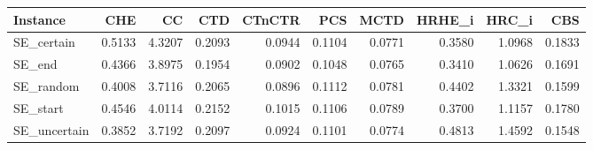 \begin{tabular}{lrrrrrrrrr}
\toprule
Instance & CHE & CC & CTD & CTnCTR & PCS & MCTD & HRHE_i & HRC_i & CBS \\
\midrule
SE_certain & 0.5133 & 4.3207 & 0.2093 & 0.0944 & 0.1104 & 0.0771 & 0.3580 & 1.0968 & 0.1833 \\
SE_end & 0.4366 & 3.8975 & 0.1954 & 0.0902 & 0.1048 & 0.0765 & 0.3410 & 1.0626 & 0.1691 \\
SE_random & 0.4008 & 3.7116 & 0.2065 & 0.0896 & 0.1112 & 0.0781 & 0.4402 & 1.3321 & 0.1599 \\
SE_start & 0.4546 & 4.0114 & 0.2152 & 0.1015 & 0.1106 & 0.0789 & 0.3700 & 1.1157 & 0.1780 \\
SE_uncertain & 0.3852 & 3.7192 & 0.2097 & 0.0924 & 0.1101 & 0.0774 & 0.4813 & 1.4592 & 0.1548 \\
\bottomrule
\end{tabular}
